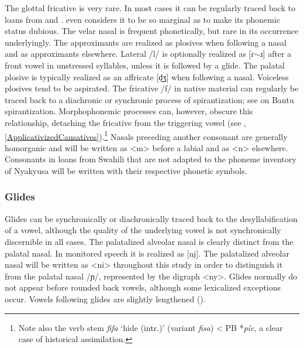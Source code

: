 The glottal fricative is very rare. In most cases it can be regularly traced back to loans from  and  \citep[218]{LabroussiC1998}. \citet{NurseD1979} even considers it to be so marginal as to make its phonemic status dubious. The velar nasal is frequent phonetically, but rare in its occurrence underlyingly. The approximants are realized as plosives when following a nasal and as approximants elsewhere. Lateral /l/ is optionally realized as [ɾ$\sim$ɹ] after a front vowel in unstressed syllables, unless it is followed by a glide. The palatal plosive is typically realized as an affricate [d͜ʒ] when following a nasal. Voiceless plosives tend to be aspirated. The fricative /f/ in native material can regularly be traced back to a diachronic or synchronic process of spirantization; see \citet{BoestonK2008} on Bantu spirantization. Morphophonemic processes can, however, obscure this relationship, detaching the fricative from the triggering vowel (see , \ref{ApplicativizedCausatives}).\footnote{Note also the verb stem \textit{fifa} `hide (intr.)' (variant \textit{fisa}) < PB *\textit{píc}, a clear case of historical assimilation.} Nasals preceding another consonant are generally homorganic and will be written as <m> before a labial and as <n> elsewhere. Consonants in loans from Swahili that are not adapted to the phoneme inventory of Nyakyusa will be written with their respective phonetic symbols.

\subsubsection{Glides}\label{glides}
Glides can be synchronically or diachronically traced back to the desyllabification of a vowel, although the quality of the underlying vowel is not synchronically discernible in all cases. The palatalized alveolar nasal is clearly distinct from the palatal nasal. In monitored speech it is realized as [ni̯]. The palatalized alveolar nasal will be written as <ni> throughout this study in order to distinguish it from the palatal nasal /ɲ/, represented by the digraph <ny>.  Glides normally do not appear before rounded back vowels, although some lexicalized exceptions occur. Vowels following glides are slightly lengthened ().

